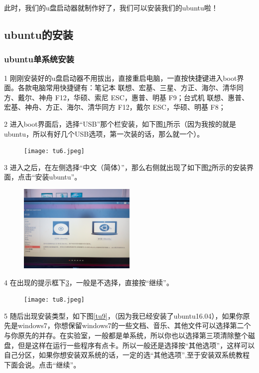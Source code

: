 \documentclass[12pt]{article}
\begin{document}
此时，我们的u盘启动器就制作好了，我们可以安装我们的ubuntu啦！

\subsection{ubuntu的安装}

\subsubsection{ubuntu单系统安装}

  1 刚刚安装好的u盘启动器不用拔出，直接重启电脑，一直按快捷键进入boot界面。各款电脑常用快捷键有：笔记本 联想、宏基、三星、方正、海尔、清华同方、戴尔、神舟 F12，华硕、索尼 ESC，惠普、明基 F9；台式机 联想、惠普、宏基、神舟、方正、海尔、清华同方 F12，戴尔 ESC，华硕、明基 F8；

  2 进入boot界面后，选择“USB”那个栏安装，如下图\ref{tu6}所示（因为我按的就是ubuntu，所以有好几个USB选项，第一次装的话，那么就一个）。

\begin{figure}[!htb] %
\centering
\texttt{[image: tu6.jpeg]}
\caption{}
\label{tu6}
\end{figure} 

  3 进入之后，在左侧选择“中文（简体）”，那么右侧就出现了如下图\ref{tu7}所示的安装界面，点击“安装ubuntu”。

\begin{figure}[!htb] %
\centering
\includegraphics[width=0.5\textwidth]{tu7.jpeg}
\caption{}
\label{tu7}
\end{figure}
 
  4 在出现的提示框下\ref{tu8}，一般是不选择，直接按“继续”。

\begin{figure}[!htb] %
\centering
\texttt{[image: tu8.jpeg]}
\caption{}
\label{tu8}
\end{figure} 

  5 随后出现安装类型，如下图\ref{tu9}，（因为我已经安装了ubuntu16.04），如果你原先是windows7，你想保留windows7的一些文档、音乐、其他文件可以选择第二个与你原先的并存。在实验室，一般都是单系统，所以你也以选择第三项清除整个磁盘，但是这样在运行一些程序有点卡。所以一般还是选择按“其他选项”，这样可以自己分区，如果你想安装双系统的话，一定的选{\color{red}“其他选项”},至于安装双系统教程下面会说。点击“继续”。
\end{document}
